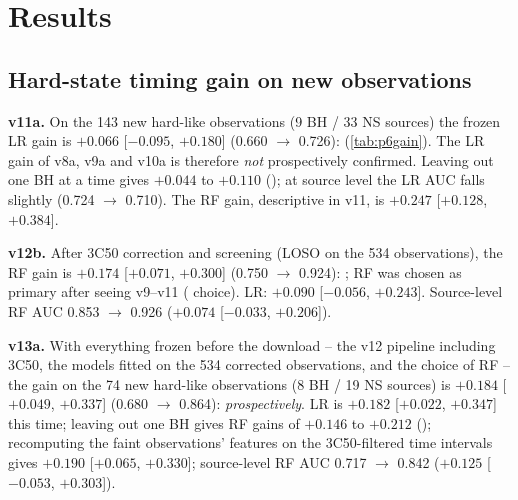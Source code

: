 \section{Results}\label{sec:p6results}

\subsection{Hard-state timing gain on new observations}\label{sec:p6gain}
\Primary{} \textbf{v11a.} On the 143 new hard-like observations (9 BH / 33 NS sources) the frozen LR gain is $+0.066$ [$-0.095$, $+0.180$]
(0.660 $\to$ 0.726): \NotDetected{} (\cref{tab:p6gain}). The LR gain of v8a, v9a and v10a is therefore \emph{not} prospectively
confirmed. Leaving out one BH at a time gives $+0.044$ to $+0.110$ (); at source level the LR AUC
falls slightly (0.724 $\to$ 0.710). The RF gain, descriptive in v11, is $+0.247$ [$+0.128$, $+0.384$].

\Primary{} \textbf{v12b.} After 3C50 correction and screening (LOSO on the 534 observations), the RF gain is $+0.174$ [$+0.071$, $+0.300$]
(0.750 $\to$ 0.924): \Detected; RF was chosen as primary after seeing v9--v11 (\PostHoc{} choice). LR: $+0.090$ [$-0.056$, $+0.243$].
Source-level RF AUC 0.853 $\to$ 0.926 ($+0.074$ [$-0.033$, $+0.206$]).

\Primary{} \textbf{v13a.} With everything frozen before the download -- the v12 pipeline including 3C50, the models fitted on the 534
corrected observations, and the choice of RF -- the gain on the 74 new hard-like observations (8 BH / 19 NS sources) is $+0.184$
[$+0.049$, $+0.337$] (0.680 $\to$ 0.864): \Detected{} \emph{prospectively}. LR is $+0.182$ [$+0.022$, $+0.347$] this time; leaving out one
BH gives RF gains of $+0.146$ to $+0.212$ (); recomputing the faint observations' features on the
3C50-filtered time intervals gives $+0.190$ [$+0.065$, $+0.330$]; source-level RF AUC 0.717 $\to$ 0.842 ($+0.125$ [$-0.053$, $+0.303$]).

